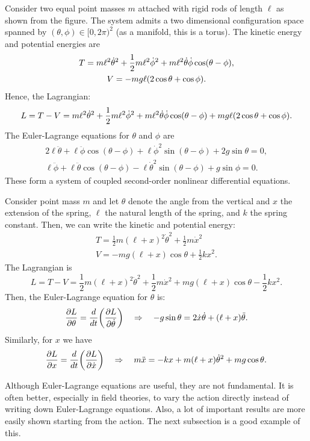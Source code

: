 \documentclass{article}
\begin{document}
\begin{example}
	Consider two equal point masses $ m $ attached with rigid rods of length $ \ell $ as shown from the figure. The system admits a two dimensional configuration space spanned by $ (\theta, \phi) \in [0,2\pi)^{2} $ (as a manifold, this is a torus). The kinetic energy and potential energies are
	\begin{gather*}
		T = m \ell^{2} \dot{\theta}^{2} + \frac{1}{2} m \ell^{2} \dot{\phi}^{2} + m \ell^{2} \dot{\theta} \dot{\phi} \cos(\theta - \phi), \\
		V = - mg\ell \qty(2\cos\theta + \cos \phi).
	\end{gather*}
	Hence, the Lagrangian:
	\[
		L = T - V = m \ell^{2} \dot{\theta}^{2} + \frac{1}{2} m \ell^{2} \dot{\phi}^{2} + m \ell^{2} \dot{\theta} \dot{\phi} \cos(\theta - \phi) + mg\ell \qty(2\cos\theta + \cos \phi).
	\]
	The Euler-Lagrange equations for $ \theta $ and $ \phi $ are
	\begin{gather*}
		2\ell \ddot{\theta} + \ell \ddot{\phi} \cos(\theta - \phi) + \ell \dot{\phi}^{2} \sin(\theta - \phi) + 2g \sin \theta = 0, \\
		\ell \ddot{\phi} + \ell \ddot{\theta} \cos(\theta - \phi) - \ell \dot{\theta}^{2} \sin(\theta - \phi) + g \sin \phi = 0.
	\end{gather*}
	These form a system of coupled second-order nonlinear differential equations. 
\end{example}
\begin{example}
	Consider point mass $ m $ and let $ \theta $ denote the angle from the vertical and $ x $ the extension of the spring, $ \ell $ the natural length of the spring, and $ k $ the spring constant. Then, we can write the kinetic and potential energy:
	\begin{gather*}
		T = \frac{1}{2} m (\ell + x)^{2} \dot{\theta}^{2} + \frac{1}{2} m \dot{x}^{2} \\
		V = - mg (\ell + x) \cos \theta  + \frac{1}{2} k x^{2}.
	\end{gather*}
	The Lagrangian is
	\[
		L = T - V = \frac{1}{2} m (\ell + x)^{2} \dot{\theta}^{2} + \frac{1}{2} m \dot{x}^{2} + mg (\ell + x) \cos \theta  - \frac{1}{2} k x^{2}.
	\]
	Then, the Euler-Lagrange equation for $ \theta $ is:
	\[
		\pdv{L}{\theta} = \dv{t}(\pdv{L}{\dot{\theta}}) \quad \Rightarrow \quad -g \sin\theta = 2 \dot{x} \dot{\theta} +  (\ell + x) \ddot{\theta}.
	\]
	Similarly, for $ x $ we have
	\[
		\pdv{L}{x} = \dv{t}(\pdv{L}{\dot{x}}) \quad \Rightarrow \quad m\ddot{x} = - k x + m (\ell + x) \dot{\theta}^{2} + mg \cos \theta.
	\]
\end{example}
\begin{note}
	Although Euler-Lagrange equations are useful, they are not fundamental. It is often better, especially in field theories, to vary the action directly instead of writing down Euler-Lagrange equations. Also, a lot of important results are more easily shown starting from the action. The next subsection is a good example of this.
\end{note}
\end{document}
